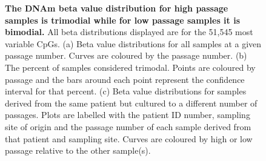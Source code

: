 \documentclass[a4paper]{article}
\begin{document}
\begin{figure}
\begin{flushleft}
\caption{\textbf{The DNAm beta value distribution for high passage samples is trimodial while for low passage samples it is bimodial.} All beta distributions displayed are for the 51,545 most variable CpGs. (a) Beta value distributions for all samples at a given passage number. Curves are coloured by the passage number. (b) The percent of samples considered trimodal. Points are coloured by passage and the bars around each point represent the confidence interval for that percent. (c) Beta value distributions for samples derived from the same patient but cultured to a different number of passages. Plots are labelled with the patient ID number, sampling site of origin and the passage number of each sample derived from that patient and sampling site. Curves are coloured by high or low passage relative to the other sample(s).}
\label{fig:main}
\end{flushleft}
\end{figure}
\end{document}
